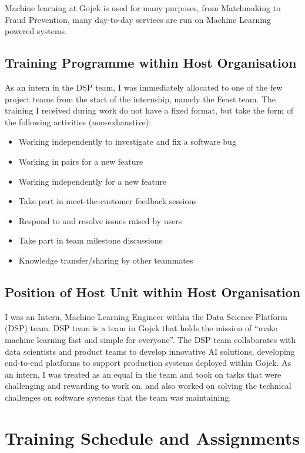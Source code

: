 \documentclass[a4paper, 12pt, fleqn]{report}
\begin{document}
Machine learning at Gojek is used for many purposes, from Matchmaking to
Fraud Prevention, many day-to-day services are run on Machine Learning powered
systems.

\section{Training Programme within Host Organisation}
As an intern in the DSP team, I was immediately allocated to one of the few
project teams from the start of the internship, namely the Feast team. The
training I received during work do not have a fixed format, but take the form of
the following activities (non-exhaustive):

\begin{itemize}
  \item Working independently to investigate and fix a software bug
  \item Working in pairs for a new feature
  \item Working independently for a new feature
  \item Take part in meet-the-customer feedback sessions
  \item Respond to and resolve issues raised by users
  \item Take part in team milestone discussions
  \item Knowledge transfer/sharing by other teammates
\end{itemize}

\section{Position of Host Unit within Host Organisation}
I was an Intern, Machine Learning Engineer within the Data Science Platform
(DSP) team. DSP team is a team in Gojek that holds the mission of ``make machine
learning fast and simple for everyone''. The DSP team collaborates with data
scientists and product teams to develop innovative AI solutions, developing
end-to-end platforms to support production systems deployed within Gojek. As an
intern, I was treated as an equal in the team and took on tasks that were
challenging and rewarding to work on, and also worked on solving the technical
challenges on software systems that the team was maintaining. \newline

\chapter{Training Schedule and Assignments}
\end{document}
